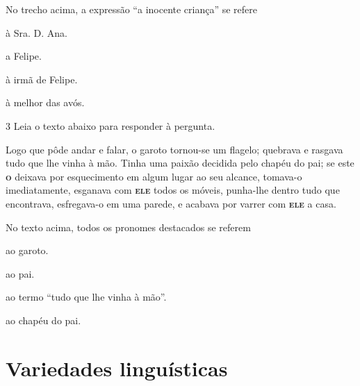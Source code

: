 No trecho acima, a expressão ``a inocente criança'' se refere

\begin{escolha}
  
  \item à Sra. D. Ana.
  
  \item a Felipe.
  
  \item à irmã de Felipe. 
  
  \item à melhor das avós.

\end{escolha}

\num{3} Leia o texto abaixo para responder à pergunta.

\begin{myquote}

Logo que pôde andar e falar, o garoto tornou-se um flagelo; quebrava e rasgava tudo
que lhe vinha à mão. Tinha uma paixão decidida pelo chapéu do pai;
se este \textsc{\textbf{o}} deixava por esquecimento em algum lugar ao seu alcance, tomava-o
imediatamente, esganava com \textsc{\textbf{ele}} todos os móveis, punha-lhe dentro tudo que
encontrava, esfregava-o em uma parede, e acabava por varrer com \textsc{\textbf{ele}} a casa.


\end{myquote}


No texto acima, todos os pronomes destacados se referem 

\begin{escolha}

  \item ao garoto.

  \item ao pai. 

  \item ao termo ``tudo que lhe vinha à mão''. 

  \item ao chapéu do pai.

\end{escolha}


\chapter{Variedades linguísticas}

